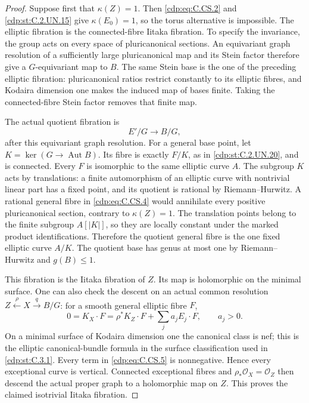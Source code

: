 \begin{proof}
Suppose first that $\kappa(Z)=1$. Then
\eqref{cdp:eq:C.CS.2} and \ref{cdp:st:C.2.UN.15} give $\kappa(E_0)=1$,
so the torus alternative is impossible. The
elliptic fibration is the connected-fibre
Iitaka fibration. To specify the invariance,
the group acts on every space of pluricanonical
sections. An equivariant graph resolution of
a sufficiently large pluricanonical map and
its Stein factor therefore give a $G$-equivariant
map to $B$. The same Stein base is the one
of the preceding elliptic fibration: pluricanonical
ratios restrict constantly to its elliptic
fibres, and Kodaira dimension one makes the
induced map of bases finite. Taking the
connected-fibre Stein factor removes that
finite map.

The actual quotient fibration is
\[
                   E'/G\longrightarrow B/G,
                                                               \tag{C.CS.4}\label{cdp:eq:C.CS.4}
\]
after this equivariant graph resolution.
For a general base point, let
$K=\ker(G\to\operatorname{Aut}B)$.
Its fibre is exactly $F/K$, as in \ref{cdp:st:C.2.UN.20},
and is connected. Every $F$ is isomorphic
to the same elliptic curve $A$.
The subgroup $K$ acts by translations:
a finite automorphism of an elliptic curve
with nontrivial linear part has a fixed
point, and its quotient is rational by
Riemann--Hurwitz. A rational general fibre
in \eqref{cdp:eq:C.CS.4} would annihilate every positive
pluricanonical section, contrary to
$\kappa(Z)=1$. The translation points
belong to the finite subgroup $A[|K|]$,
so they are locally constant under the
marked product identifications. Therefore
the quotient general fibre is the one
fixed elliptic curve $A/K$.
The quotient base has genus at most one
by Riemann--Hurwitz and $g(B)\le1$.

This fibration is the Iitaka fibration
of $Z$. Its map is holomorphic on the
minimal surface. One can also check the
descent on an actual common resolution
$Z\xleftarrow{\rho}X\xrightarrow q B/G$:
for a smooth general elliptic fibre $F$,
\[
 0=K_X\cdot F
   =\rho^*K_Z\cdot F+\sum_j a_jE_j\cdot F,
                   \qquad a_j>0.
                                                               \tag{C.CS.5}\label{cdp:eq:C.CS.5}
\]
On a minimal surface of Kodaira dimension
one the canonical class is nef; this is
the elliptic canonical-bundle formula
in the surface classification used in
\ref{cdp:st:C.3.1}. Every term in \eqref{cdp:eq:C.CS.5} is
nonnegative. Hence every exceptional
curve is vertical. Connected exceptional
fibres and $\rho_*\mathcal O_X=\mathcal O_Z$
then descend the actual proper graph to
a holomorphic map on $Z$. This proves
the claimed isotrivial Iitaka fibration.


\end{proof}
